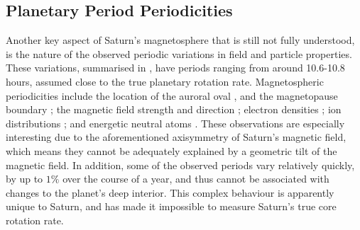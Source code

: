 \subsection{Planetary Period Periodicities}\label{intro:sec:periodicities}
Another key aspect of Saturn's magnetosphere that is still not fully understood, is the nature of the observed periodic variations in field and particle properties. These variations, summarised in \citet{carbary2013}, have periods ranging from around 10.6-10.8 hours, assumed close to the true planetary rotation rate. Magnetospheric periodicities include the location of the auroral oval \citep{provan2009b}, and the magnetopause boundary \citep{clarke2010}; the magnetic field strength and direction \citep{espinosa2000, andrews2008}; electron densities \citep{morooka2009}; ion distributions \citep{burch2009}; and energetic neutral atoms \citep{paranicas2005}. These observations are especially interesting due to the aforementioned axisymmetry of Saturn's magnetic field, which means they cannot be adequately explained by a geometric tilt of the magnetic field. In addition, some of the observed periods vary relatively quickly, by up to $1\%$ over the course of a year, and thus cannot be associated with changes to the planet's deep interior. This complex behaviour is apparently unique to Saturn, and has made it impossible to measure Saturn's true core rotation rate.

